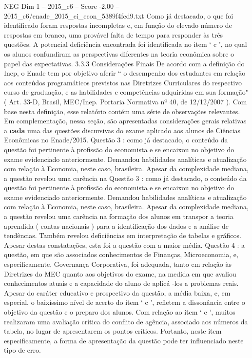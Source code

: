 \begin{textsample}{NEG Dim 1 – 2015\_c6 – Score -2.00 – 2015\_c6/enade\_2015\_ci\_econ\_5389f4fcd9.txt}
Como já destacado, o que foi identificado foram respostas incompletas e, em função do elevado número de respostas em branco, uma provável falta de tempo para responder às três questões.
A potencial deficiência encontrada foi identificada no item ‘ c ’, no qual os alunos confundiram as perspectivas diferentes na teoria econômica sobre o papel das expectativas. 3.3.3 Considerações Finais De acordo com a definição do Inep, o Enade tem por objetivo aferir “ o desempenho dos estudantes em relação aos conteúdos programáticos previstos nas Diretrizes Curriculares do respectivo curso de graduação, e as habilidades e competências adquiridas em sua formação"( Art. 33-D, Brasil, MEC/Inep.
Portaria Normativa nº 40, de 12/12/2007 ).
Com base nesta definição, esse relatório contém uma série de observações relevantes.
Em complementação, nessa seção, são apresentadas considerações gerais relativas a \textbf{cada} uma das questões discursivas do exame aplicado aos alunos de Ciências Econômicas no Enade/2015.
Questão 3 : como já destacado, o conteúdo da questão foi pertinente à profissão do economista e se encaixou no objetivo do exame evidenciado anteriormente.
Demandou habilidades analíticas e atualização com relação à Economia, neste caso, brasileira.
Apesar da complexidade mediana, a questão revelou uma carência na Questão 3 : como já destacado, o conteúdo da questão foi pertinente à profissão do economista e se encaixou no objetivo do exame evidenciado anteriormente.
Demandou habilidades analíticas e atualização com relação à Economia, neste caso, brasileira.
Apesar da complexidade mediana, a questão revelou uma carência na formação dos alunos em transpor a teoria aprendida ( contas nacionais ) para a identificação dos dados e a análise de tendências.
Também revelou deficiências em interpretação de tabelas e gráficos.
Apesar destas constatações, esta foi a questão com a maior média.
Questão 4 : a questão, em que são associados conhecimentos de Finanças, Microeconomia, e, especificamente, Governança Corporativa, foi adequada, tanto em relação às Diretrizes do MEC quanto aos objetivos do exame, na medida em que avaliou conhecimentos atuais e a capacidade do aluno de aplicá -los a problemas reais.
Apesar do caráter educativo e prospectivo da questão, a média baixa, e, em especial, o baixíssimo nível de acerto do item ‘ c ’, refletem a dissonância entre o objetivo da questão e o preparo dos alunos.
Com relação ao item ‘ c ’, muitos realizaram uma avaliação crítica do conflito de agência, associado aos números da tabela, no lugar de apresentarem os pontos críticos.
Portanto, neste item especificamente, a forma de apresentação da questão pode ter influenciado neste tipo de erro.

\end{textsample}

